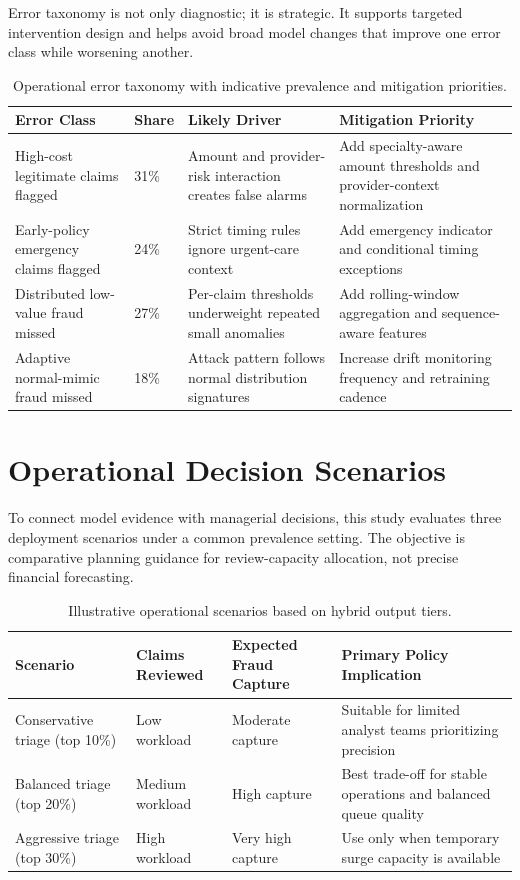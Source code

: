 \documentclass[12pt,a4paper]{report}
\begin{document}
Error taxonomy is not only diagnostic; it is strategic. It supports targeted intervention design and helps avoid broad model changes that improve one error class while worsening another.

\begin{table}[H]
\caption{Operational error taxonomy with indicative prevalence and mitigation priorities.}
\label{tab:error_taxonomy_detailed}
\begin{tabular}{p{}p{}p{}p{}}
\toprule
\textbf{Error Class} & \textbf{Share} & \textbf{Likely Driver} & \textbf{Mitigation Priority} \\
\midrule
High-cost legitimate claims flagged & 31\% & Amount and provider-risk interaction creates false alarms & Add specialty-aware amount thresholds and provider-context normalization \\
Early-policy emergency claims flagged & 24\% & Strict timing rules ignore urgent-care context & Add emergency indicator and conditional timing exceptions \\
Distributed low-value fraud missed & 27\% & Per-claim thresholds underweight repeated small anomalies & Add rolling-window aggregation and sequence-aware features \\
Adaptive normal-mimic fraud missed & 18\% & Attack pattern follows normal distribution signatures & Increase drift monitoring frequency and retraining cadence \\
\bottomrule
\end{tabular}
\end{table}

\section{Operational Decision Scenarios}
To connect model evidence with managerial decisions, this study evaluates three deployment scenarios under a common prevalence setting. The objective is comparative planning guidance for review-capacity allocation, not precise financial forecasting.

\begin{table}[H]
\caption{Illustrative operational scenarios based on hybrid output tiers.}
\label{tab:operational_scenarios}
\begin{tabular}{p{}p{}p{}p{}}
\toprule
\textbf{Scenario} & \textbf{Claims Reviewed} & \textbf{Expected Fraud Capture} & \textbf{Primary Policy Implication} \\
\midrule
Conservative triage (top 10\%) & Low workload & Moderate capture & Suitable for limited analyst teams prioritizing precision \\
Balanced triage (top 20\%) & Medium workload & High capture & Best trade-off for stable operations and balanced queue quality \\
Aggressive triage (top 30\%) & High workload & Very high capture & Use only when temporary surge capacity is available \\
\bottomrule
\end{tabular}
\end{table}
\end{document}
